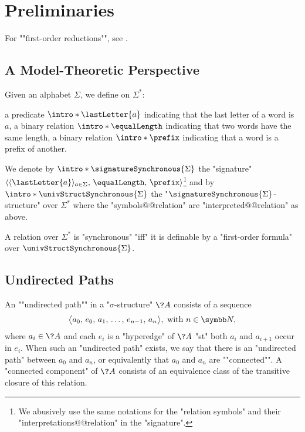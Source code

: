 \section{\AP\label{sec:dichotomy-preliminaries}%
	Preliminaries}

For \AP""first-order reductions"", see
\cite[Definition 2.11 \& Definition 1.26]{Immerman1998DescriptiveComplexity}.

\subsection{A Model-Theoretic Perspective}

Given an alphabet $\Sigma$, we define on $\Sigma^*$:
\begin{itemize}
	\itemAP a predicate $\intro*\lastLetter{a}$ indicating that the last letter of a word is $a$,
	\itemAP a binary relation $\intro*\equalLength$ indicating that two words have the same length,
	\itemAP a binary relation $\intro*\prefix$ indicating that a word is a prefix of another.
\end{itemize} 
We denote by $\intro*\signatureSynchronous{\Sigma}$ the "signature" $\langle \langle\lastLetter{a}\rangle_{a \in \Sigma},\, \equalLength,\, \prefix \rangle$\footnote{We abusively use the same notations for
the "relation symbols" and their "interpretations@@relation" in the "signature".} and
by \AP$\intro*\univStructSynchronous{\Sigma}$ the "$\signatureSynchronous{\Sigma}$-structure" over $\Sigma^*$ where
the "symbols@@relation" are "interpreted@@relation" as above.

\begin{proposition}
	\label{prop:synchronous-first-order}
	A relation over $\Sigma^*$ is "synchronous" "iff" it is definable by a "first-order formula" over \(\univStructSynchronous{\Sigma}\).
\end{proposition}

\subsection{Undirected Paths}

An \AP""undirected path"" in a "$\sigma$-structure" $\?A$ consists of a sequence
\[\big\langle a_0,\, e_0,\, a_1,\, \hdots,\, e_{n-1},\, a_n\big\rangle, \text{ with } n \in \N,\]
where $a_i \in \?A$ and each $e_i$ is a "hyperedge" of $\?A$ "st" both
$a_i$ and $a_{i+1}$ occur in $e_i$. When such an "undirected path" exists, we say that
there is an "undirected path" between $a_0$ and $a_n$, or equivalently
that $a_0$ and $a_n$ are \AP""connected"". A \AP"connected component" of $\?A$ consists of an equivalence class of the 
transitive closure of this relation.

